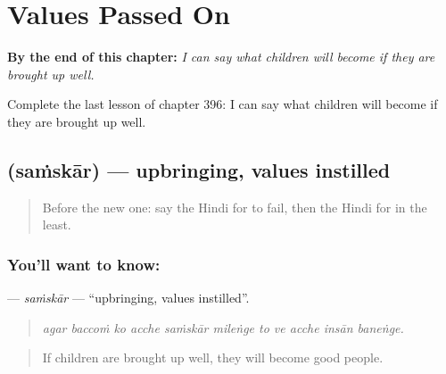 
\chapter{Values Passed On}
\label{ch:hi-values-passed-on}

\begin{chapteropening}
\textbf{By the end of this chapter:} \emph{I can say what children will become if they are brought up well.}

Complete the last lesson of chapter 396: I can say what children will become if they are brought up well.
\end{chapteropening}

\section[\texorpdfstring{\hi{संस्कार} (saṁskār)}{संस्कार (saṁskār)}]{ (saṁskār) — upbringing, values instilled}

\label{lesson:HI-C396-samskar}



\begin{quote}
Before the new one: say the Hindi for to fail, then the Hindi for in the least.
\end{quote}

\subsection*{You'll want to know: }
\textbf{} — \emph{saṁskār} — \textquotedblleft{}upbringing, values instilled\textquotedblright{}.

\begin{quote}
          
\end{quote}

\begin{quote}
\emph{agar baccoṁ ko acche saṁskār mileṅge to ve acche insān baneṅge.}
\end{quote}

\begin{quote}
If children are brought up well, they will become good people.
\end{quote}

